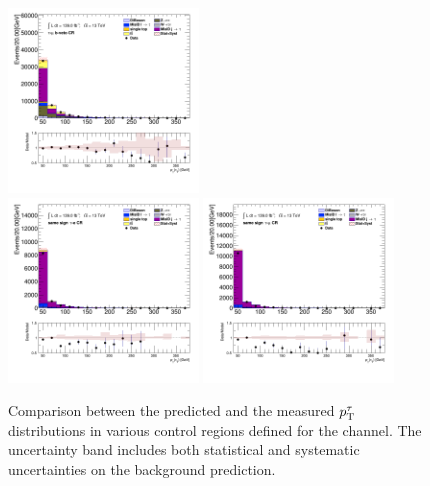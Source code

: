 \begin{figure}[!htp]
\begin{center}
			\includegraphics[width=0.45\textwidth]{chapters/chapter6_HPlus/images/taulep/tau_0_pt_TAUMU_BVETO.png} \\
			\includegraphics[width=0.45\textwidth]{chapters/chapter6_HPlus/images/taulep/tau_0_pt_SS_TAUEL.png} 
			\includegraphics[width=0.45\textwidth]{chapters/chapter6_HPlus/images/taulep/tau_0_pt_SS_TAUMU.png} \\
			\end{center}
			\caption{
			Comparison between the predicted and the measured $p_{\text{T}}^{\tau}$ distributions in various control regions defined for the \taulep channel. The uncertainty band includes both statistical and systematic uncertainties on the background prediction. 
			}
			\label{fig:bkg-pt-tau-taulep}
		\end{figure}


